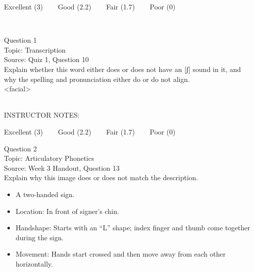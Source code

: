 \documentclass[12pt]{article}
\begin{document}
\vfill
Excellent (3) ~~~ Good (2.2) ~~~ Fair (1.7) ~~~ Poor (0)
\newpage

\begin{center}
\textbf{{\color{red}{\HUGE END OF EXAM}}}\\

\end{center}
\newpage

\begin{center}
\textbf{{\color{blue}{\HUGE START OF EXAM\\}}}

\textbf{{\color{blue}{\HUGE Student ID: 52900\\}}}

\textbf{{\color{blue}{\HUGE \\}}}

\end{center}
\newpage

{\large Question 1}\\

Topic: Transcription\\
Source: Quiz 1, Question 10\\

Explain whether this word either does or does not have an [ʃ] sound in it, and why the spelling and pronunciation either do or do not align.\\

<facial>


~\\
INSTRUCTOR NOTES: 


\vfill
Excellent (3) ~~~ Good (2.2) ~~~ Fair (1.7) ~~~ Poor (0)
\newpage

{\large Question 2}\\

Topic: Articulatory Phonetics\\
Source: Week 3 Handout, Question 13\\

Explain why this image does or does not match the description.\\

\begin{itemize} \item A two-handed sign. \item Location: In front of signer’s chin. \item Handshape: Starts with an “L” shape; index finger and thumb come together during the sign. \item Movement: Hands start crossed and then move away from each other horizontally. \end{itemize}
\end{document}
